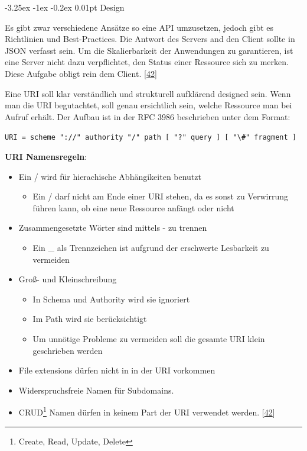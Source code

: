 \documentclass[
    headings=optiontotocandhead,%
    twoside,
    numbers=noenddot,%
    12pt, %
    titlepage, %
    parskip=full, %
    listof=leveldown, 
    numbers=noenddot, %
    a4paper,DIV=14,
    BCOR=15mm,
]{scrbook}
\makeatletter
\newcommand{\passthrough}[1]{#1}
\providecommand{\tightlist}{%
  \setlength{\itemsep}{0pt}\setlength{\parskip}{0pt}}
\renewcommand\paragraph{\@startsection{paragraph}{4}{\z@}%
    {-3.25ex \@plus -1ex \@minus -0.2ex}%
    {0.01pt}%
    {\raggedsection\normalfont\sectfont\nobreak\size@paragraph}%
  }
\makeatother
\begin{document}
\hypertarget{design}{%
\paragraph{Design}\label{design}}

Es gibt zwar verschiedene Ansätze so eine API umzusetzen, jedoch gibt es
Richtlinien und Best-Practices. Die Antwort des Servers and den Client
sollte in JSON verfasst sein. Um die Skalierbarkeit der Anwendungen zu
garantieren, ist eine Server nicht dazu verpflichtet, den Status einer
Ressource sich zu merken. Diese Aufgabe obligt rein dem Client.
{[}\protect\hyperlink{ref-REST-API-Design-Rulebook}{42}{]}

Eine URI soll klar verständlich und strukturell aufklärend designed
sein. Wenn man die URI begutachtet, soll genau ersichtlich sein, welche
Ressource man bei Aufruf erhält. Der Aufbau ist in der RFC 3986
beschrieben unter dem Format:

\passthrough{\lstinline!URI = scheme "://" authority "/" path [ "?" query ] [ "\#" fragment ]!}

\textbf{URI Namensregeln}:

\begin{itemize}
\tightlist
\item
  Ein / wird für hierachische Abhängikeiten benutzt

  \begin{itemize}
  \tightlist
  \item
    Ein / darf nicht am Ende einer URI stehen, da es sonst zu Verwirrung
    führen kann, ob eine neue Ressource anfängt oder nicht
  \end{itemize}
\item
  Zusammengesetzte Wörter sind mittels - zu trennen

  \begin{itemize}
  \tightlist
  \item
    Ein \_ als Trennzeichen ist aufgrund der erschwerte Lesbarkeit zu
    vermeiden
  \end{itemize}
\item
  Groß- und Kleinschreibung

  \begin{itemize}
  \tightlist
  \item
    In Schema und Authority wird sie ignoriert
  \item
    Im Path wird sie berücksichtigt
  \item
    Um unnötige Probleme zu vermeiden soll die gesamte URI klein
    geschrieben werden
  \end{itemize}
\item
  File extensions dürfen nicht in in der URI vorkommen
\item
  Widerspruchsfreie Namen für Subdomains.
\item
  CRUD\footnote{Create, Read, Update, Delete} Namen dürfen in keinem
  Part der URI verwendet werden.
  {[}\protect\hyperlink{ref-REST-API-Design-Rulebook}{42}{]}
\end{itemize}
\end{document}
